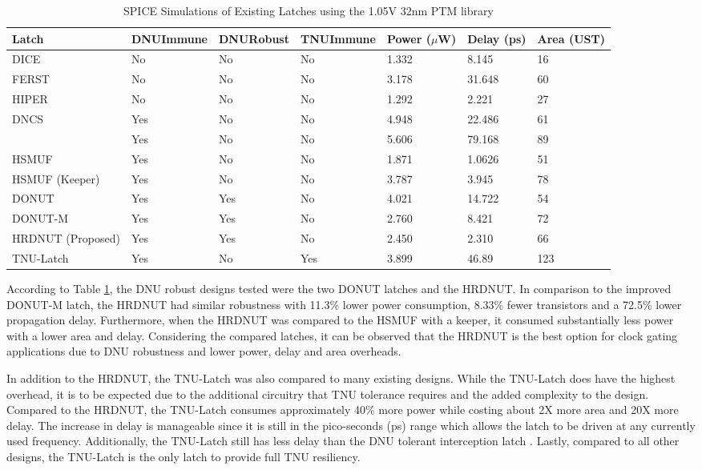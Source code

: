 \begin{table}[h]
\begin{center}
	\caption{SPICE Simulations of Existing Latches using the 1.05V 32nm PTM library }
	\label{table:rtable}
	\begin{tabular}{|m{5em}|m{3.5em}|m{3em}|m{3.5em}|m{2em}|m{2.5em}|m{2em}|}
	\hline
	Latch & DNU\newline Immune & DNU\newline Robust & TNU\newline Immune & Power ($\mu$W) & Delay (ps) & Area (UST)\\ 
	\hline
	DICE & No & No & No & 1.332 & 8.145 & 16 \\
	\hline
	FERST & No & No & No & 3.178 & 31.648 & 60 \\
	\hline
	HIPER & No & No & No & 1.292 & 2.221 & 27 \\
	\hhline{|=|=|=|=|=|=|=|}
	DNCS & Yes & No & No & 4.948 & 22.486 & 61 \\
	\hline
	\cite{Inter} & Yes & No & No & 5.606 & 79.168 & 89 \\
	\hline
	HSMUF & Yes & No & No & 1.871 & 1.0626 & 51 \\
	\hline
	HSMUF (Keeper) & Yes & No & No & 3.787 & 3.945 & 78 \\
	\hhline{|=|=|=|=|=|=|=|}
	DONUT \cite{DONUT} & Yes & Yes & No & 4.021 & 14.722 & 54 \\ 
	\hline
	DONUT-M & Yes & Yes & No & 2.760 & 8.421 & 72\\
	\hline
	HRDNUT (Proposed) & Yes & Yes & No & 2.450 & 2.310 & 66 \\
	\hline
	TNU-Latch & Yes & No & Yes & 3.899 & 46.89 & 123 \\
	\hline
	\end{tabular}
\end{center}
\end{table}

According to Table \ref{table:rtable}, the DNU robust designs tested were the two DONUT latches and the HRDNUT. In comparison to the improved DONUT-M latch, the HRDNUT had similar robustness with 11.3\% lower power consumption, 8.33\% fewer transistors and a 72.5\% lower propagation delay. Furthermore, when the HRDNUT was compared to the HSMUF with a keeper, it consumed substantially less power with a lower area and delay. Considering the compared latches, it can be observed that the HRDNUT is the best option for clock gating applications due to DNU robustness and lower power, delay and area overheads.

In addition to the HRDNUT, the TNU-Latch was also compared to many existing designs. While the TNU-Latch does have the highest overhead, it is to be expected due to the additional circuitry that TNU tolerance requires and the added complexity to the design. Compared to the HRDNUT, the TNU-Latch consumes approximately 40\% more power while costing about 2X more area and 20X more delay. The increase in delay is manageable since it is still in the pico-seconds (ps) range which allows the latch to be driven at any currently used frequency. Additionally, the TNU-Latch still has less delay than the DNU tolerant interception latch \cite{Inter}. Lastly, compared to all other designs, the TNU-Latch is the only latch to provide full TNU resiliency.